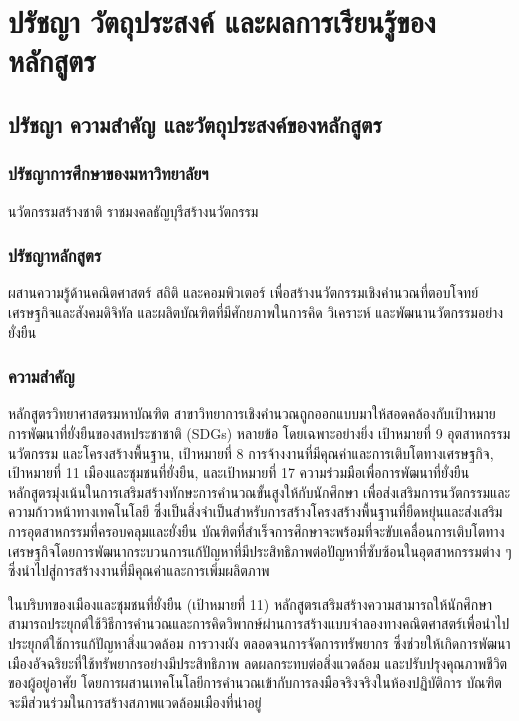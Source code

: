 \chapter{ปรัชญา วัตถุประสงค์ และผลการเรียนรู้ของหลักสูตร}

\section{ปรัชญา ความสำคัญ และวัตถุประสงค์ของหลักสูตร}

\subsection{ปรัชญาการศึกษาของมหาวิทยาลัยฯ}

นวัตกรรมสร้างชาติ ราชมงคลธัญบุรีสร้างนวัตกรรม

\subsection*{\hspace{10mm} ปรัชญาหลักสูตร}

ผสานความรู้ด้านคณิตศาสตร์ สถิติ และคอมพิวเตอร์ เพื่อสร้างนวัตกรรมเชิงคำนวณที่ตอบโจทย์เศรษฐกิจและสังคมดิจิทัล และผลิตบัณฑิตที่มีศักยภาพในการคิด วิเคราะห์ และพัฒนานวัตกรรมอย่างยั่งยืน

\subsection{ความสำคัญ} 

หลักสูตรวิทยาศาสตรมหาบัณฑิต สาขาวิทยาการเชิงคำนวณถูกออกแบบมาให้สอดคล้องกับเป้าหมายการพัฒนาที่ยั่งยืนของสหประชาชาติ (SDGs) หลายข้อ โดยเฉพาะอย่างยิ่ง เป้าหมายที่ 9 อุตสาหกรรม นวัตกรรม และโครงสร้างพื้นฐาน, เป้าหมายที่ 8 การจ้างงานที่มีคุณค่าและการเติบโตทางเศรษฐกิจ, เป้าหมายที่ 11 เมืองและชุมชนที่ยั่งยืน, และเป้าหมายที่ 17 ความร่วมมือเพื่อการพัฒนาที่ยั่งยืน หลักสูตรมุ่งเน้นในการเสริมสร้างทักษะการคำนวณขั้นสูงให้กับนักศึกษา เพื่อส่งเสริมการนวัตกรรมและความก้าวหน้าทางเทคโนโลยี ซึ่งเป็นสิ่งจำเป็นสำหรับการสร้างโครงสร้างพื้นฐานที่ยืดหยุ่นและส่งเสริมการอุตสาหกรรมที่ครอบคลุมและยั่งยืน บัณฑิตที่สำเร็จการศึกษาจะพร้อมที่จะขับเคลื่อนการเติบโตทางเศรษฐกิจโดยการพัฒนากระบวนการแก้ปัญหาที่มีประสิทธิภาพต่อปัญหาที่ซับซ้อนในอุตสาหกรรมต่าง ๆ ซึ่งนำไปสู่การสร้างงานที่มีคุณค่าและการเพิ่มผลิตภาพ

ในบริบทของเมืองและชุมชนที่ยั่งยืน (เป้าหมายที่ 11) หลักสูตรเสริมสร้างความสามารถให้นักศึกษาสามารถประยุกต์ใช้วิธีการคำนวณและการคิดวิพากษ์ผ่านการสร้างแบบจำลองทางคณิตศาสตร์เพื่อนำไปประยุกต์ใช้การแก้ปัญหาสิ่งแวดล้อม การวางผัง ตลอดจนการจัดการทรัพยากร ซึ่งช่วยให้เกิดการพัฒนาเมืองอัจฉริยะที่ใช้ทรัพยากรอย่างมีประสิทธิภาพ ลดผลกระทบต่อสิ่งแวดล้อม และปรับปรุงคุณภาพชีวิตของผู้อยู่อาศัย โดยการผสานเทคโนโลยีการคำนวณเข้ากับการลงมือจริงจริงในห้องปฏิบัติการ บัณฑิตจะมีส่วนร่วมในการสร้างสภาพแวดล้อมเมืองที่น่าอยู่

